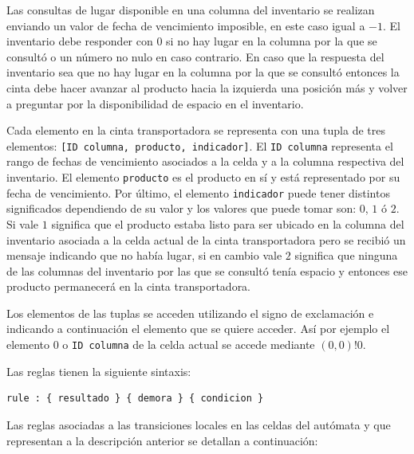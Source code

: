 \documentclass[10pt]{article}
\begin{document}
Las consultas de lugar disponible en una columna del inventario se realizan enviando un valor de fecha de vencimiento imposible, en este caso igual a $-1$. El inventario debe responder con $0$ si no hay lugar en la columna por la que se consultó o un número no nulo en caso contrario. En caso que la respuesta del inventario sea que no hay lugar en la columna por la que se consultó entonces la cinta debe hacer avanzar al producto hacia la izquierda una posición más y volver a preguntar por la disponibilidad de espacio en el inventario.

Cada elemento en la cinta transportadora se representa con una tupla de tres elementos: \texttt{[ID columna, producto, indicador]}. El \texttt{ID columna} representa el rango de fechas de vencimiento asociados a la celda y a la columna respectiva del inventario. El elemento \texttt{producto} es el producto en sí y está representado por su fecha de vencimiento. Por último, el elemento \texttt{indicador} puede tener distintos significados dependiendo de su valor y los valores que puede tomar son: $0$, $1$ ó $2$. Si vale $1$ significa que el producto estaba listo para ser ubicado en la columna del inventario asociada a la celda actual de la cinta transportadora pero se recibió un mensaje indicando que no había lugar, si en cambio vale $2$ significa que ninguna de las columnas del inventario por las que se consultó tenía espacio y entonces ese producto permanecerá en la cinta transportadora.

Los elementos de las tuplas se acceden utilizando el signo de exclamación e indicando a continuación el elemento que se quiere acceder. Así por ejemplo el elemento $0$ o \texttt{ID columna} de la celda actual se accede mediante $(0,0)!0$.

Las reglas tienen la siguiente sintaxis: 
\begin{lstlisting}
rule : { resultado } { demora } { condicion }
\end{lstlisting}

Las reglas asociadas a las transiciones locales en las celdas del autómata y que representan a la descripción anterior se detallan a continuación:
\end{document}
